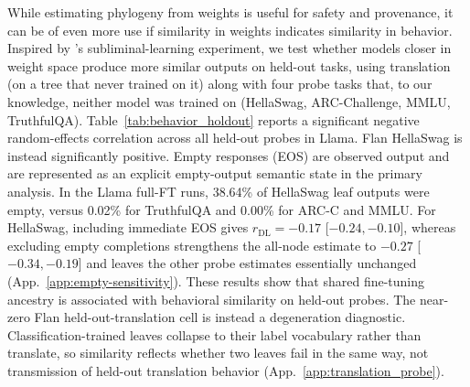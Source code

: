 \documentclass{article}
\theoremstyle{definition}
\theoremstyle{plain}
\begin{document}
While estimating phylogeny from weights is useful for safety and provenance, it can be of even more use if similarity in weights indicates similarity in behavior. Inspired by \citet{cloud2025subliminal}'s subliminal-learning experiment, we test
whether models closer in weight space produce more similar outputs on held-out tasks, using translation
(on a tree that never trained on it) along with four probe tasks that, to our knowledge, neither model
was trained on (HellaSwag, ARC-Challenge, MMLU, TruthfulQA).
Table~\ref{tab:behavior_holdout} reports a significant negative random-effects correlation across all held-out
probes in Llama. Flan HellaSwag is instead significantly positive. Empty responses (EOS) are observed output and are represented as an
explicit empty-output semantic state in the primary analysis. In the Llama full-FT runs,
38.64\% of HellaSwag leaf outputs were empty, versus 0.02\% for TruthfulQA and 0.00\% for ARC-C
and MMLU. For HellaSwag, including immediate EOS gives $r_{\mathrm{DL}}=-0.17$ [$-0.24,-0.10$], whereas excluding empty completions strengthens the all-node estimate to $-0.27$ [$-0.34,-0.19$] and leaves the other probe estimates essentially unchanged (App.~\ref{app:empty-sensitivity}). These results show that shared fine-tuning ancestry is associated with behavioral similarity on held-out probes. The near-zero Flan held-out-translation cell is instead a degeneration diagnostic.
Classification-trained leaves collapse to their label vocabulary rather than translate, so similarity
reflects whether two leaves fail in the same way, not transmission of held-out translation behavior
(App.~\ref{app:translation_probe}).
\end{document}
